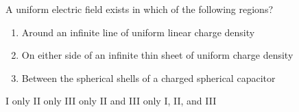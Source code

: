 \begin{questions}\setcounter{question}{12}\question
A uniform electric field exists in which of the following regions?
\begin{enumerate}
    \item Around an infinite line of uniform linear charge density
    \item On either side of an infinite thin sheet of uniform charge density
    \item Between the spherical shells of a charged spherical capacitor
\end{enumerate}

\begin{oneparchoices}
\choice I only
\choice II only
\choice III only
\choice II and III only
\choice I, II, and III
\end{oneparchoices}\end{questions}

